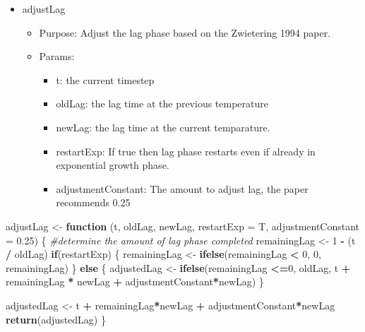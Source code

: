 \documentclass[]{article}
\newenvironment{Shaded}{\begin{snugshade}}{\end{snugshade}}
\newcommand{\CommentTok}[1]{\textcolor[rgb]{0.56,0.35,0.01}{\textit{#1}}}
\newcommand{\ControlFlowTok}[1]{\textcolor[rgb]{0.13,0.29,0.53}{\textbf{#1}}}
\newcommand{\DataTypeTok}[1]{\textcolor[rgb]{0.13,0.29,0.53}{#1}}
\newcommand{\DecValTok}[1]{\textcolor[rgb]{0.00,0.00,0.81}{#1}}
\newcommand{\FloatTok}[1]{\textcolor[rgb]{0.00,0.00,0.81}{#1}}
\newcommand{\KeywordTok}[1]{\textcolor[rgb]{0.13,0.29,0.53}{\textbf{#1}}}
\newcommand{\NormalTok}[1]{#1}
\newcommand{\OperatorTok}[1]{\textcolor[rgb]{0.81,0.36,0.00}{\textbf{#1}}}
\newcommand{\StringTok}[1]{\textcolor[rgb]{0.31,0.60,0.02}{#1}}
\providecommand{\tightlist}{%
  \setlength{\itemsep}{0pt}\setlength{\parskip}{0pt}}
\begin{document}
\begin{itemize}
\tightlist
\item
  adjustLag

  \begin{itemize}
  \tightlist
  \item
    Purpose: Adjust the lag phase based on the Zwietering 1994 paper.
  \item
    Params:

    \begin{itemize}
    \tightlist
    \item
      t: the current timestep
    \item
      oldLag: the lag time at the previous temperature
    \item
      newLag: the lag time at the current temparature.
    \item
      restartExp: If true then lag phase restarts even if already in
      exponential growth phase.
    \item
      adjustmentConstant: The amount to adjust lag, the paper recommends
      0.25
    \end{itemize}
  \end{itemize}
\end{itemize}

\begin{Shaded}
\begin{Highlighting}[]
\NormalTok{adjustLag <-}\StringTok{ }\ControlFlowTok{function}\NormalTok{ (t, oldLag, newLag, }\DataTypeTok{restartExp =}\NormalTok{ T, }\DataTypeTok{adjustmentConstant =} \FloatTok{0.25}\NormalTok{) \{}
  \CommentTok{#determine the amount of lag phase completed}
\NormalTok{  remainingLag <-}\StringTok{ }\DecValTok{1} \OperatorTok{-}\StringTok{ }\NormalTok{(t }\OperatorTok{/}\StringTok{ }\NormalTok{oldLag)}
  \ControlFlowTok{if}\NormalTok{(restartExp) \{}
\NormalTok{  remainingLag <-}\StringTok{ }\KeywordTok{ifelse}\NormalTok{(remainingLag }\OperatorTok{<}\StringTok{ }\DecValTok{0}\NormalTok{, }\DecValTok{0}\NormalTok{, remainingLag)}
\NormalTok{  \}}
  \ControlFlowTok{else}\NormalTok{ \{}
\NormalTok{  adjustedLag <-}\StringTok{ }\KeywordTok{ifelse}\NormalTok{(remainingLag }\OperatorTok{<=}\DecValTok{0}\NormalTok{, oldLag,}
\NormalTok{                        t }\OperatorTok{+}\StringTok{ }\NormalTok{remainingLag }\OperatorTok{*}\StringTok{ }\NormalTok{newLag }\OperatorTok{+}\StringTok{ }\NormalTok{adjustmentConstant}\OperatorTok{*}\NormalTok{newLag)}
\NormalTok{  \}}
  
\NormalTok{  adjustedLag <-}\StringTok{ }\NormalTok{t }\OperatorTok{+}\StringTok{ }\NormalTok{remainingLag}\OperatorTok{*}\NormalTok{newLag }\OperatorTok{+}\StringTok{ }\NormalTok{adjustmentConstant}\OperatorTok{*}\NormalTok{newLag}
  \KeywordTok{return}\NormalTok{(adjustedLag)}
\NormalTok{\}}
\end{Highlighting}
\end{Shaded}
\end{document}
